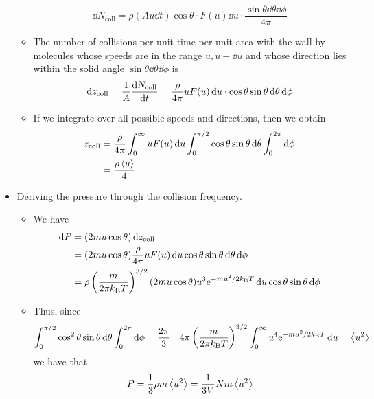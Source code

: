 \documentclass[../notes.tex]{subfiles}
\begin{document}
\begin{itemize}
\begin{itemize}
\begin{equation*}
            \dd{N_\text{coll}} = \rho(Au\dd{t})\cos\theta\cdot F(u)\dd{u}\cdot\frac{\sin\theta\dd{\theta\dd{\phi}}}{4\pi}
        \end{equation*}
        \item The number of collisions per unit time per unit area with the wall by molecules whose speeds are in the range $u,u+\dd{u}$ and whose direction lies within the solid angle $\sin\theta\dd{\theta}\dd{\phi}$ is
        \begin{equation*}
            \dd{z_\text{coll}} = \frac{1}{A}\dv{N_\text{coll}}{t}
            = \frac{\rho}{4\pi}uF(u)\dd{u}\cdot\cos\theta\sin\theta\dd{\theta}\dd{\phi}
        \end{equation*}
        \item If we integrate over all possible speeds and directions, then we obtain
        \begin{align*}
            z_\text{coll} &= \frac{\rho}{4\pi}\int_0^\infty uF(u)\dd{u}\int_0^{\pi/2}\cos\theta\sin\theta\dd{\theta}\int_0^{2\pi}\dd{\phi}\\
            &= \frac{\rho\prb{u}}{4}
        \end{align*}
    \end{itemize}
    \item Deriving the pressure through the collision frequency.
    \begin{itemize}
        \item We have
        \begin{align*}
            \dd{P} &= (2mu\cos\theta)\dd{z_\text{coll}}\\
            &= (2mu\cos\theta)\frac{\rho}{4\pi}uF(u)\dd{u}\cos\theta\sin\theta\dd{\theta}\dd{\phi}\\
            &= \rho\left( \frac{m}{2\pi\kB T} \right)^{3/2}(2mu\cos\theta)u^3\e[-mu^2/2\kB T]\dd{u}\cos\theta\sin\theta\dd{\phi}
        \end{align*}
        \item Thus, since
        \begin{align*}
            \int_0^{\pi/2}\cos^2\theta\sin\theta\dd{\theta}\int_0^{2\pi}\dd{\phi} &= \frac{2\pi}{3}&
            4\pi\left( \frac{m}{2\pi\kB T} \right)^{3/2}\int_0^\infty u^4\e[-mu^2/2\kB T]\dd{u} &= \prb{u^2}
        \end{align*}
        we have that
        \begin{equation*}
            P = \frac{1}{3}\rho m\prb{u^2}
            = \frac{1}{3V}Nm\prb{u^2}
        \end{equation*}
    \end{itemize}
\end{itemize}
\end{document}
